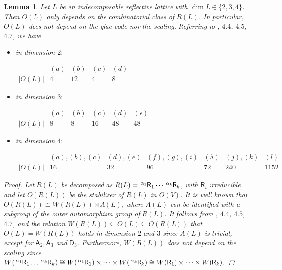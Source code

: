 \documentclass{amsart}
\newtheorem{lem}[thm]{Lemma}
\theoremstyle{definition}
\theoremstyle{remark}
\newcommand{\sA}{\mathsf A}  %
\newcommand{\sD}{\mathsf D}
\newcommand{\sR}{\mathsf R}
\newcommand{\xsR}[1]{\hspace{0.5mm}^{#1}\hspace*{-0.2mm}\mathsf R}
\begin{document}
\begin{lem}
 Let $L$ be an indecomposable reflective lattice with $\dim L \in \{2,3,4\}$. Then $O(L)$ only depends on the combinatorial class of $R(L)$.
 In particular, $O(L)$ does not depend on the glue-code nor the scaling. Referring to \cite{bs96}, $4.4$, $4.5$, $4.7$, we have
 \begin{itemize}
  \item[(a)] in dimension $2:$
  \renewcommand{\arraystretch}{1.2}
  \begin{center}
   $
   \begin{array}{c|c|c|c|c}
          & (a) & (b) & (c) & (d) \\
   \hline
   |O(L)| & 4 & 12 & 4 & 8
   \end{array}
   $
  \end{center}
  \item[(b)] in dimension $3:$
  \renewcommand{\arraystretch}{1.2}
  \begin{center}
   $
   \begin{array}{c|c|c|c|c|c}
          & (a) & (b) & (c) & (d) & (e)\\
   \hline
   |O(L)| & 8 & 8 & 16 & 48 & 48
   \end{array}
   $
  \end{center}
  \item[(c)] in dimension $4:$
  \renewcommand{\arraystretch}{1.2}
  \begin{center}
   $
   \begin{array}{c|c|c|c|c|c|c}
          & (a),(b),(c) & (d),(e) & (f),(g),(i) & (h) & (j),(k) & (l)\\
   \hline
   |O(L)| & 16 & 32 & 96 & 72 & 240 & 1152
   \end{array}
   $
  \end{center}
 \end{itemize}
 \begin{proof}
  Let $R(L)$ be decomposed as $R(L) = \xsR{\alpha_1}_1 \cdots \xsR{\alpha_k}_k$, with $\sR_i$ irreducible and let $O(R(L))$ be the stabilizer of $R(L)$ in $O(V)$.
  It is well known that $O(R(L)) \cong W(R(L)) \rtimes A(L)$, where $A(L)$ can be identified with a subgroup of the outer automorphism group of $R(L)$.
  It follows from \cite{bs96}, $4.4$, $4.5$, $4.7$, and the relation $W(R(L)) \subseteq O(L) \subseteq O(R(L))$ that $O(L) = W(R(L))$ holds in dimension $2$ and $3$
  since $A(L)$ is trivial, except for $\sA_2, \sA_3$ and $\sD_3$.
  Furthermore, $W(R(L))$ does not depend on the scaling since 
  $W(\xsR{\alpha_1}_1 \dots \xsR{\alpha_k}_k) \cong W(\xsR{\alpha_1}_1) \times \cdots \times W(\xsR{\alpha_k}_k) \cong W(\sR_1) \times \cdots \times W(\sR_k).$

\end{proof}
\end{lem}
\end{document}
